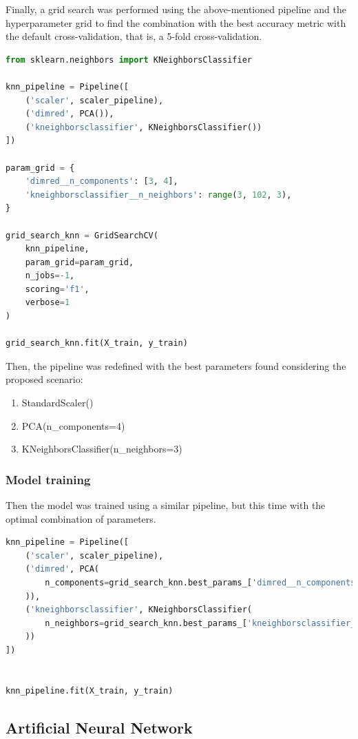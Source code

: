 \documentclass{article}
\begin{document}
Finally, a grid search was performed using the above-mentioned pipeline and the hyperparameter grid to find the combination with the best accuracy metric with the default cross-validation, that is, a 5-fold cross-validation.
\begin{lstlisting}[language=Python]
from sklearn.neighbors import KNeighborsClassifier

knn_pipeline = Pipeline([
    ('scaler', scaler_pipeline), 
    ('dimred', PCA()), 
    ('kneighborsclassifier', KNeighborsClassifier())
])

param_grid = {
    'dimred__n_components': [3, 4], 
    'kneighborsclassifier__n_neighbors': range(3, 102, 3),
}

grid_search_knn = GridSearchCV(
    knn_pipeline,
    param_grid=param_grid,
    n_jobs=-1,
    scoring='f1',
    verbose=1
)

grid_search_knn.fit(X_train, y_train)
\end{lstlisting}

Then, the pipeline was redefined with the best parameters found considering the proposed scenario:
\begin{enumerate}
    \item StandardScaler()
    \item PCA(n\_components=4)
    \item KNeighborsClassifier(n\_neighbors=3)
\end{enumerate}

\subsubsection{Model training}
Then the model was trained using a similar pipeline, but this time with the optimal combination of parameters.

\begin{lstlisting}[language=Python]
knn_pipeline = Pipeline([
    ('scaler', scaler_pipeline), 
    ('dimred', PCA(
        n_components=grid_search_knn.best_params_['dimred__n_components']
    )),
    ('kneighborsclassifier', KNeighborsClassifier(
        n_neighbors=grid_search_knn.best_params_['kneighborsclassifier__n_neighbors']
    ))
])


knn_pipeline.fit(X_train, y_train)
\end{lstlisting}

\subsection{Artificial Neural Network}
\end{document}
